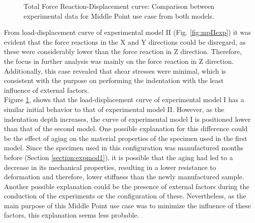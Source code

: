 \begin{figure}%
    \centering
   \quad
   \caption{Total Force Reaction-Displacement curve: Comparison between experimental data for Middle Point use case from both models.}%
   \label{fig:midpointexpIvsexpII}%
\end{figure}

From load-displacement curve of experimental model II (Fig. \ref{fig:mpIIexp}) it was evident that the
force reactions in the X and Y directions could be disregard, as these were considerably lower than
the force reaction in Z direction. Therefore, the focus in further analysis was mainly 
on the force reaction in Z direction. Additionally, this case revealed that shear stresses were minimal, 
which is consistent with the purpose on performing the indentation with the least influence of external factors.\\

Figure \ref{fig:midpointexpIvsexpII}, shows that the load-displacement curve
of experimental model I has a similar initial behavior to that of experimental model II.
However, as the indentation depth increases, the curve of experimental model I is positioned 
lower than that of the second model. One possible explanation for this difference could be the effect of aging 
on the material properties of the specimen used in the first model. Since the specimen used in this 
configuration was manufactured months before (Section \ref{section:expmod1}), it is possible that the aging 
had led to a decrease in its mechanical properties, resulting in a lower resistance to deformation
and therefore, lower stiffness than the newly manufactured sample.
Another possible explanation could be the presence of external factors during the conduction of 
the experiments or the configuration of these. Nevertheless, as the main purpose of this Middle Point 
use case was to minimize the influence of these factors, this explanation seems less probable.

